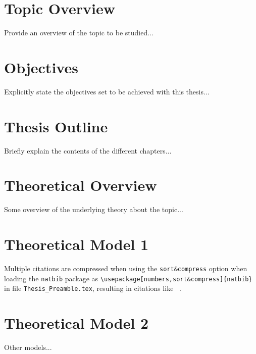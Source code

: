 

\section{Topic Overview}
\label{section:overview}

Provide an overview of the topic to be studied...


\section{Objectives}
\label{section:objectives}

Explicitly state the objectives set to be achieved with this thesis...


\section{Thesis Outline}
\label{section:outline}

Briefly explain the contents of the different chapters...



\section{Theoretical Overview}
\label{section:overview}


Some overview of the underlying theory about the topic...


\section{Theoretical Model 1}
\label{section:theory1}



Multiple citations are compressed when using the {\tt sort\&compress} option when loading the {\tt natbib} package as {\tt \textbackslash usepackage[numbers,sort\&compress]\{natbib\}} in file {\tt Thesis\_Preamble.tex}, resulting in citations like ~\citep{Hull,Wilmott}.


\section{Theoretical Model 2}
\label{section:theory2}

Other models...




